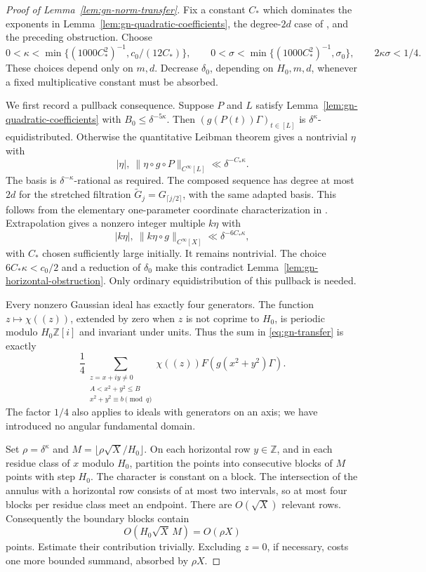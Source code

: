 \documentclass[11pt]{article}
\theoremstyle{definition}
\theoremstyle{remark}
\begin{document}
\begin{proof}[Proof of Lemma~\ref{lem:gn-norm-transfer}]
Fix a constant $C_*$ which dominates the exponents in
Lemma~\ref{lem:gn-quadratic-coefficients}, the degree-$2d$ case of
\cite[Theorem 2.9]{GTOrbits2012}, and the preceding obstruction.
Choose
\[
 0<\kappa<\min\{(1000C_*^2)^{-1},c_0/(12C_*)\},\qquad
 0<\sigma<\min\{(1000C_*^2)^{-1},\sigma_0\},
 \qquad 2\kappa\sigma<1/4.
\]
These choices depend only on $m,d$. Decrease $\delta_0$, depending on
$H_0,m,d$, whenever a fixed multiplicative constant must be absorbed.

We first record a pullback consequence. Suppose $P$ and $L$ satisfy
Lemma~\ref{lem:gn-quadratic-coefficients} with
$B_0\leq\delta^{-5\kappa}$. Then
$(g(P(t))\Gamma)_{t\in[L]}$ is $\delta^\kappa$-equidistributed.
Otherwise the quantitative Leibman theorem gives a nontrivial $\eta$
with
\[
 |\eta|,\ \|\eta\circ g\circ P\|_{C^\infty[L]}
     \ll\delta^{-C_*\kappa}.
\]
The basis is $\delta^{-\kappa}$-rational as required. The composed
sequence has degree at most $2d$ for the stretched filtration
$\widetilde G_j=G_{\lceil j/2\rceil}$, with the same adapted basis.
This follows from the elementary one-parameter coordinate
characterization in \cite[Lemma 6.7]{GTOrbits2012}.
Extrapolation gives a nonzero integer multiple $k\eta$ with
\[
 |k\eta|,\ \|k\eta\circ g\|_{C^\infty[X]}
       \ll\delta^{-6C_*\kappa},
\]
with $C_*$ chosen sufficiently large initially. It remains nontrivial. The choice
$6C_*\kappa<c_0/2$ and a reduction of $\delta_0$ make this contradict
Lemma~\ref{lem:gn-horizontal-obstruction}. Only ordinary
equidistribution of this pullback is needed.

Every nonzero Gaussian ideal has exactly four generators. The function
$z\mapsto\chi((z))$, extended by zero when $z$ is not coprime to $H_0$,
is periodic modulo $H_0\mathbb Z[i]$ and invariant under units. Thus the
sum in \eqref{eq:gn-transfer} is exactly
\[
 \frac14\sum_{\substack{z=x+iy\ne0\\A<x^2+y^2\leq B\\
                         x^2+y^2\equiv b\pmod q}}
       \chi((z))F(g(x^2+y^2)\Gamma).
\]
The factor $1/4$ also applies to ideals with generators on an axis;
we have introduced no angular fundamental domain.

Set $\rho=\delta^\kappa$ and
$M=\lfloor\rho\sqrt X/H_0\rfloor$. On each horizontal row $y\in
\mathbb Z$, and in each residue class of $x$ modulo $H_0$, partition
the points into consecutive blocks of $M$ points with step $H_0$.
The character is constant on a block. The intersection of the annulus
with a horizontal row consists of at most two intervals, so at most
four blocks per residue class meet an endpoint. There are $O(\sqrt X)$
relevant rows. Consequently the boundary blocks contain
\[
 O(H_0\sqrt X\,M)=O(\rho X)
\]
points. Estimate their contribution trivially. Excluding $z=0$, if
necessary, costs one more bounded summand, absorbed by $\rho X$.


\end{proof}
\end{document}
